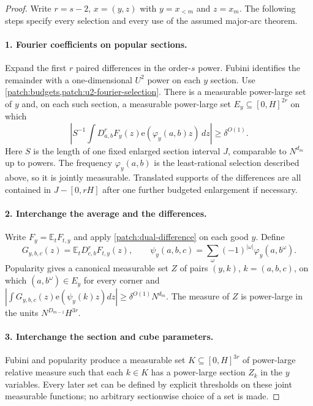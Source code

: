 \documentclass[11pt]{article}
\theoremstyle{definition}
\newcommand{\ee}[1]{\mathrm e\!\left(#1\right)}
\begin{document}
\begin{proof}
Write $r=s-2$, $x=(y,z)$ with $y=x_{<m}$ and $z=x_m$.
The following steps specify every selection and every use of the assumed major-arc theorem.

\paragraph{1. Fourier coefficients on popular sections.}
Expand the first $r$ paired differences in the order-$s$ power.  Fubini identifies the
remainder with a one-dimensional $U^2$ power on each $y$ section.
Use \cref{patch:budgets,patch:u2-fourier-selection}.  There is a measurable power-large set
of $y$ and, on each such section, a measurable power-large set $E_y\subseteq[0,H]^{2r}$
on which
\[
 \left|S^{-1}\int D_{a,b}^{r}F_y(z)\ee{\varphi_y(a,b)z}\,dz\right|\geq\delta^{O(1)}.
\]
Here $S$ is the length of one fixed enlarged section interval $J$, comparable to $N^{d_m}$
up to powers.  The frequency $\varphi_y(a,b)$ is the least-rational selection described above,
so it is jointly measurable.  Translated supports of the differences are all contained in
$J-[0,rH]$ after one further budgeted enlargement if necessary.

\paragraph{2. Interchange the average and the differences.}
Write $F_y=\mathbb E_tF_{t,y}$ and apply \cref{patch:dual-difference} on each good $y$.
Define
\[
 G_{y,b,c}(z)=\mathbb E_tD_{c,b}^{r}F_{t,y}(z),\qquad
 \psi_y(a,b,c)=\sum_\omega(-1)^{|\omega|}\varphi_y(a,b^\omega).
\]
Popularity gives a canonical measurable set $Z$ of pairs $(y,k)$, $k=(a,b,c)$, on which
$(a,b^\omega)\in E_y$ for every corner and
$|\int G_{y,b,c}(z)\ee{\psi_y(k)z}dz|\geq\delta^{O(1)}N^{d_m}$.
The measure of $Z$ is power-large in the units $N^{D_{m-1}}H^{3r}$.

\paragraph{3. Interchange the section and cube parameters.}
Fubini and popularity produce a measurable set $K\subseteq[0,H]^{3r}$ of power-large relative
measure such that each $k\in K$ has a power-large section $Z_k$ in the $y$ variables.
Every later set can be defined by explicit thresholds on these joint measurable functions;
no arbitrary sectionwise choice of a set is made.


\end{proof}
\end{document}
